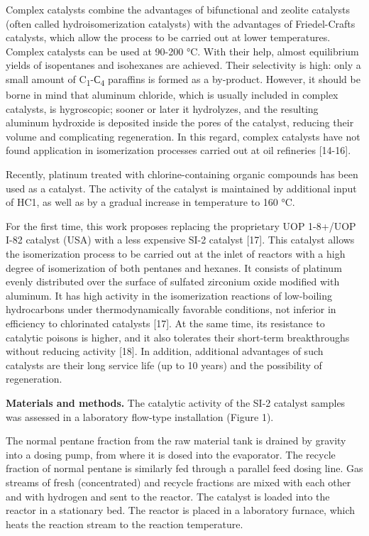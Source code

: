 Complex catalysts combine the advantages of bifunctional and zeolite
catalysts (often called hydroisomerization catalysts) with the
advantages of Friedel-Crafts catalysts, which allow the process to be
carried out at lower temperatures. Complex catalysts can be used at
90-200 °C. With their help, almost equilibrium yields of isopentanes and
isohexanes are achieved. Their selectivity is high: only a small amount
of C\textsubscript{1}-С\textsubscript{4} paraffins is formed as a
by-product. However, it should be borne in mind that aluminum chloride,
which is usually included in complex catalysts, is hygroscopic; sooner
or later it hydrolyzes, and the resulting aluminum hydroxide is
deposited inside the pores of the catalyst, reducing their volume and
complicating regeneration. In this regard, complex catalysts have not
found application in isomerization processes carried out at oil
refineries {[}14-16{]}.

Recently, platinum treated with chlorine-containing organic compounds
has been used as a catalyst. The activity of the catalyst is maintained
by additional input of HC1, as well as by a gradual increase in
temperature to 160 °C.

For the first time, this work proposes replacing the proprietary UOP
1-8+/UOP I-82 catalyst (USA) with a less expensive SI-2 catalyst
{[}17{]}. This catalyst allows the isomerization process to be carried
out at the inlet of reactors with a high degree of isomerization of both
pentanes and hexanes. It consists of platinum evenly distributed over
the surface of sulfated zirconium oxide modified with aluminum. It has
high activity in the isomerization reactions of low-boiling hydrocarbons
under thermodynamically favorable conditions, not inferior in efficiency
to chlorinated catalysts {[}17{]}. At the same time, its resistance to
catalytic poisons is higher, and it also tolerates their short-term
breakthroughs without reducing activity {[}18{]}. In addition,
additional advantages of such catalysts are their long service life (up
to 10 years) and the possibility of regeneration.

\textbf{Materials and methods.} The catalytic activity of the SI-2
catalyst samples was assessed in a laboratory flow-type installation
(Figure 1).

The normal pentane fraction from the raw material tank is drained by
gravity into a dosing pump, from where it is dosed into the evaporator.
The recycle fraction of normal pentane is similarly fed through a
parallel feed dosing line. Gas streams of fresh (concentrated) and
recycle fractions are mixed with each other and with hydrogen and sent
to the reactor. The catalyst is loaded into the reactor in a stationary
bed. The reactor is placed in a laboratory furnace, which heats the
reaction stream to the reaction temperature.

